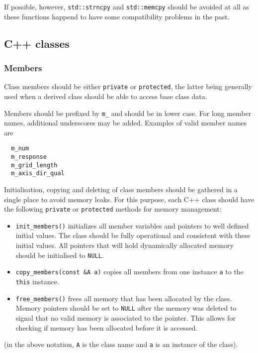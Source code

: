 \documentclass{article}[12pt,a4]
\begin{document}
If possible, however, {\tt std::strncpy} and {\tt std::memcpy} should be avoided at all as these
functions happend to have some compatibility problems in the past.



\subsection{C++ classes}

\subsubsection{Members}

Class members should be either {\tt private} or {\tt protected}, the latter being generally used
when a derived class should be able to access base class data.

Members should be prefixed by {\tt m\_} and should be in lower case.
For long member names, additional underscores may be added.
Examples of valid member names are
\begin{verbatim}
  m_num
  m_response
  m_grid_length
  m_axis_dir_qual
\end{verbatim}

Initialisation, copying and deleting of class members should be gathered in a single
place to avoid memory leaks.
For this purpose, each C++ class should have the following {\tt private} or {\tt protected}
methods for memory management:
\begin{itemize}
\item {\tt init\_members()} initializes all member variables and pointers to well defined
initial values. The class should be fully operational and consistent with these initial
values. All pointers that will hold dynamically allocated memory should be
initialised to {\tt NULL}.
\item {\tt copy\_members(const \&A a)} copies all members from one instance {\tt a}
to the {\tt this} instance.
\item {\tt free\_members()} frees all memory that has been allocated by the class.
Memory pointers should be set to {\tt NULL} after the memory was deleted to signal
that no valid memory is associated to the pointer.
This allows for checking if memory has been allocated before it is accessed.
\end{itemize}
(in the above notation, {\tt A} is the class name and {\tt a} is an instance of the class).
\end{document}
